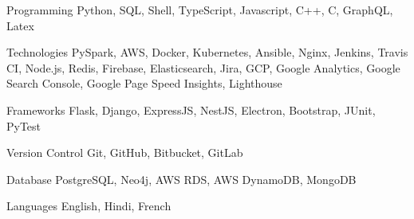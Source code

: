 

\begin{cvskills}

  \cvskill
    {Programming} %
    {Python, SQL, Shell, TypeScript, Javascript, C++, C, GraphQL, Latex} %
    
  \cvskill
    {Technologies} %
    {PySpark, AWS, Docker, Kubernetes, Ansible, Nginx, Jenkins, Travis CI, Node.js, Redis, Firebase, Elasticsearch, Jira, GCP, Google Analytics, Google Search Console, Google Page Speed Insights, Lighthouse} %

  \cvskill
    {Frameworks} %
    {Flask, Django, ExpressJS, NestJS, Electron, Bootstrap, JUnit, PyTest} %

  \cvskill
    {Version Control} %
    {Git, GitHub, Bitbucket, GitLab} %
    
  \cvskill
    {Database} %
    {PostgreSQL, Neo4j, AWS RDS, AWS DynamoDB, MongoDB} %

  \cvskill
    {Languages} %
    {English, Hindi, French} %

\end{cvskills}

